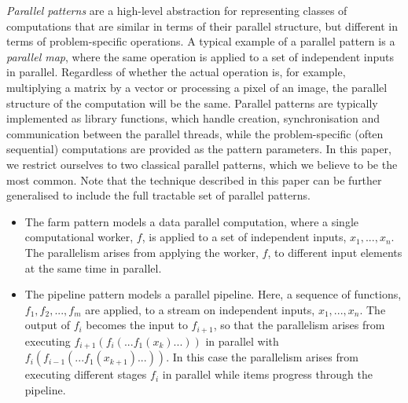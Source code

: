 \noindent
\emph{Parallel patterns} are a high-level abstraction for representing classes of computations that are similar in terms of their parallel structure, but different in terms of problem-specific operations. A typical example of a parallel pattern is a \emph{parallel map}, where the same operation is applied to a set of independent inputs in parallel. Regardless of whether the actual operation is, for example, multiplying a matrix by a vector or processing a pixel of an image, the parallel structure of the computation will be the same. Parallel patterns are typically implemented as library functions, which handle creation, synchronisation and communication between the parallel threads, while the problem-specific (often sequential) computations are provided as the pattern parameters. In this paper, we restrict ourselves to two classical parallel patterns, which we believe to be the most common. Note that the technique described in this paper can be further generalised to include the full tractable set of parallel patterns.
\begin{itemize}
    \item The farm pattern models a data parallel computation, where a single computational worker, $f$, is applied to a set of independent inputs, $x_{1}, ..., x_{n}$. The parallelism arises from applying the worker, $f$, to different input elements at the same time in parallel. 
    \item The pipeline pattern models a parallel pipeline. Here, a sequence of functions, $f_{1}, f_{2}, ..., f_{m}$ are applied, to a stream on independent inputs, $x_{1}, ..., x_{n}$. The output of $f_{i}$ becomes the input to $f_{i+1}$, so that the parallelism arises from executing $f_{i+1}(f_{i}(...f_{1}(x_{k})...))$ in parallel with $f_{i}(f_{i-1}(...f_{1}(x_{k+1})...))$. In this case the parallelism arises from executing different stages $f_{i}$ in parallel while items progress through the pipeline.
\end{itemize}


